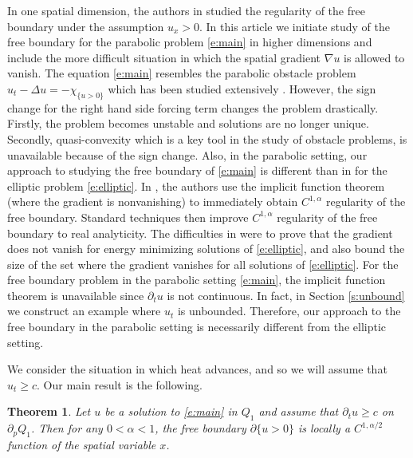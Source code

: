 \documentclass{amsart}
\newtheorem{theorem}{Theorem}[section]
\numberwithin{equation}{section}
\begin{document}
  In one spatial dimension, the authors in \cite{gh92} studied the regularity of the free boundary under the assumption $u_x>0$. In this article we initiate study of the free boundary for the parabolic problem \eqref{e:main} in higher dimensions and include the more difficult situation in which the spatial gradient $\nabla u$ is allowed to vanish. The equation \eqref{e:main} resembles the parabolic obstacle problem 
  $u_t - \Delta u=-\chi_{\{u>0\}}$ which has been studied extensively \cite{acm19}. However, the sign change for the right hand side forcing term changes the problem drastically. Firstly, the problem becomes unstable and solutions are no longer unique. Secondly, quasi-convexity which is a key tool in the study of obstacle problems, is unavailable because of the sign change. Also, in the parabolic setting, our approach to studying the free boundary of \eqref{e:main} is different than in \cite{mw07} for the elliptic problem \eqref{e:elliptic}. In \cite{mw07}, the authors use the implicit function theorem (where the gradient is nonvanishing) to immediately obtain $C^{1,\alpha}$ regularity of the free boundary. Standard techniques then improve $C^{1,\alpha}$ regularity of the free boundary to real analyticity. The difficulties in \cite{mw07} were to prove that the gradient does not vanish for energy minimizing solutions of \eqref{e:elliptic}, and also bound the size of the set where the gradient vanishes for all solutions of \eqref{e:elliptic}. For the free boundary problem in the parabolic setting \eqref{e:main}, the implicit function theorem is unavailable since $\partial_t u$ is not continuous. In fact, in Section \ref{s:unbound} we construct an example where $u_t$ is unbounded. Therefore, our approach to the free boundary in the parabolic setting is necessarily different from the elliptic setting.  
  
  We consider the situation in which heat advances, and so we will assume that $u_t \geq c$. Our main result is the following. 

  \begin{theorem} \label{t:main}
    Let $u$ be a solution to \eqref{e:main} in $Q_1$ and assume that $\partial_t u \geq c$ on 
    $\partial_p Q_1$. Then for any $0<\alpha<1$, the free boundary $\partial\{u>0\}$ is locally a $C^{1,\alpha/2}$ function of the spatial variable $x$. 
  \end{theorem}
\end{document}

